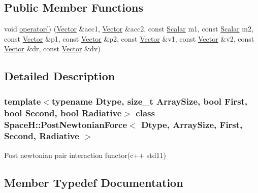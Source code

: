\subsection*{Public Member Functions}
\begin{DoxyCompactItemize}
\item 
void \mbox{\hyperlink{class_space_h_1_1_post_newtonian_force_ae22b34213f69af6bf9b5732c284afc17}{operator()}} (\mbox{\hyperlink{class_space_h_1_1_post_newtonian_force_ae9a942fc7a0c5fa260d7e8a17cb107bd}{Vector}} \&acc1, \mbox{\hyperlink{class_space_h_1_1_post_newtonian_force_ae9a942fc7a0c5fa260d7e8a17cb107bd}{Vector}} \&acc2, const \mbox{\hyperlink{class_space_h_1_1_post_newtonian_force_a4c47b7292998ddda142216f6b614bedd}{Scalar}} m1, const \mbox{\hyperlink{class_space_h_1_1_post_newtonian_force_a4c47b7292998ddda142216f6b614bedd}{Scalar}} m2, const \mbox{\hyperlink{class_space_h_1_1_post_newtonian_force_ae9a942fc7a0c5fa260d7e8a17cb107bd}{Vector}} \&p1, const \mbox{\hyperlink{class_space_h_1_1_post_newtonian_force_ae9a942fc7a0c5fa260d7e8a17cb107bd}{Vector}} \&p2, const \mbox{\hyperlink{class_space_h_1_1_post_newtonian_force_ae9a942fc7a0c5fa260d7e8a17cb107bd}{Vector}} \&v1, const \mbox{\hyperlink{class_space_h_1_1_post_newtonian_force_ae9a942fc7a0c5fa260d7e8a17cb107bd}{Vector}} \&v2, const \mbox{\hyperlink{class_space_h_1_1_post_newtonian_force_ae9a942fc7a0c5fa260d7e8a17cb107bd}{Vector}} \&dr, const \mbox{\hyperlink{class_space_h_1_1_post_newtonian_force_ae9a942fc7a0c5fa260d7e8a17cb107bd}{Vector}} \&dv)
\end{DoxyCompactItemize}


\subsection{Detailed Description}
\subsubsection*{template$<$typename Dtype, size\+\_\+t Array\+Size, bool First, bool Second, bool Radiative$>$\newline
class Space\+H\+::\+Post\+Newtonian\+Force$<$ Dtype, Array\+Size, First, Second, Radiative $>$}

Post newtonian pair interaction functor(c++ std11) 

\subsection{Member Typedef Documentation}
\mbox{\label{class_space_h_1_1_post_newtonian_force_a4c47b7292998ddda142216f6b614bedd}} 
